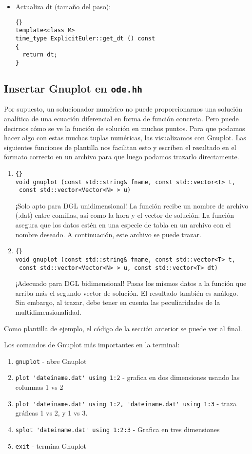 \documentclass[a4paper,11pt]{article}
\theoremstyle{definition}
\begin{document}
\begin{itemize}
\item Actualiza dt (tamaño del paso):
{\footnotesize{\begin{lstlisting}{}
template<class M>
time_type ExplicitEuler::get_dt () const
{
  return dt;
}
\end{lstlisting}}}
\end{itemize}

\subsection{Insertar Gnuplot en \lstinline{ode.hh}}
Por supuesto, un solucionador numérico no puede proporcionarnos una solución analítica de una ecuación diferencial en forma de función concreta. Pero puede decirnos cómo se ve la función de solución en muchos puntos. Para que podamos hacer algo con estas muchas tuplas numéricas, las visualizamos con Gnuplot. Las siguientes funciones de plantilla nos facilitan esto y escriben el resultado en el formato correcto en un archivo para que luego podamos trazarlo directamente.

\begin{enumerate}
\item
{\footnotesize{\begin{lstlisting}{}
void gnuplot (const std::string& fname, const std::vector<T> t,
 const std::vector<Vector<N> > u)
\end{lstlisting}}}

¡Solo apto para DGL unidimensional! La función recibe un nombre de archivo (.dat) entre comillas, así como la hora y el vector de solución. La función asegura que los datos estén en una especie de tabla en un archivo con el nombre deseado. A continuación, este archivo se puede trazar.
\item
{\footnotesize{\begin{lstlisting}{}
void gnuplot (const std::string& fname, const std::vector<T> t,
 const std::vector<Vector<N> > u, const std::vector<T> dt)
\end{lstlisting}}}

¡Adecuado para DGL bidimensional! Pasas los mismos datos a la función que arriba más el segundo vector de solución. El resultado también es análogo. Sin embargo, al trazar, debe tener en cuenta las peculiaridades de la multidimensionalidad.
\end{enumerate}

Como plantilla de ejemplo, el código de la sección anterior se puede ver al final.

Los comandos de Gnuplot más importantes en la terminal:
\begin{enumerate}
\item \lstinline{gnuplot} - abre Gnuplot
\item \lstinline{plot 'dateiname.dat' using 1:2} - grafica en dos dimensiones usando las columnas 1 vs 2 
\item \lstinline{plot 'dateiname.dat' using 1:2, 'dateiname.dat' using 1:3} - traza gráficas 1 vs 2, y 1 vs 3.
\item \lstinline{splot 'dateiname.dat' using 1:2:3} - Grafica en tres dimensiones
\item \lstinline{exit} - termina Gnuplot
\end{enumerate}
\end{document}

